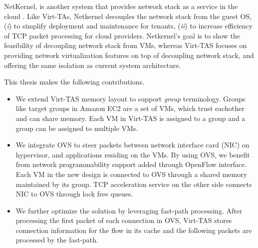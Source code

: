 NetKernel, is another system that provides network stack as a service in the cloud
\cite{niu2021netkernel, niu2017network}.
Like Virt-TAs, Netkernel decouples the network stack from the guest OS, 
(\emph{i}) to simplify deployment and maintenance for tenants, (\emph{ii}) to increase  
efficiency of TCP packet processing for cloud providers. Netkernel's 
goal is to show the feasibility of decoupling network stack from VMs, whereas Virt-TAS
focuses on providing network virtualization features on top of decoupling network stack, and 
offering the same isolation as current system architecture.

This thesis makes the following contributions.
\begin{itemize}
    \item We extend Virt-TAS memory layout to support \emph{group} terminology. Groups 
    like target groups in Amazon EC2 \cite{ec2target} are a set of VMs, which trust 
    eachother and can share memory. 
    Each VM in Virt-TAS is assigned to a group and a group can be assigned to multiple 
    VMs.

    \item We integrate OVS to steer packets between network interface card (NIC) on hypervisor, 
    and applications residing on the VMs. By using OVS, we benefit from network programmability
    support added through OpenFlow interface. Each VM in the new design is connected to OVS 
    through a shared memory maintained by its group. TCP acceleration service on the other 
    side connects NIC to OVS through lock free queues.

    \item We further optimize the solution by leveraging fast-path processing. After processing
    the first packet of each connection in OVS, Virt-TAS stores connection information 
    for the flow in its cache and the following packets are processed by the fast-path.

\end{itemize}






